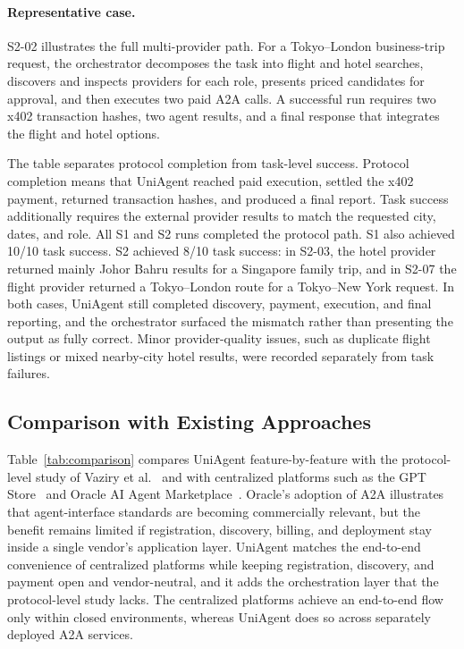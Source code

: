 \documentclass[sigconf]{acmart}
\begin{document}
\paragraph{Representative case.}
S2-02 illustrates the full multi-provider path. For a Tokyo--London
business-trip request, the orchestrator decomposes the task into flight
and hotel searches, discovers and inspects providers for each role,
presents priced candidates for approval, and then executes two paid A2A
calls. A successful run requires two x402 transaction hashes, two agent
results, and a final response that integrates the flight and hotel
options.

The table separates protocol completion from task-level
success. Protocol completion means that UniAgent reached paid execution,
settled the x402 payment, returned transaction hashes, and produced a
final report. Task success additionally requires the external provider
results to match the requested city, dates, and role. All S1 and S2 runs
completed the protocol path. S1 also achieved 10/10 task success. S2
achieved 8/10 task success: in S2-03, the hotel provider returned mainly
Johor Bahru results for a Singapore family trip, and in S2-07 the flight
provider returned a Tokyo--London route for a Tokyo--New York request.
In both cases, UniAgent still completed discovery, payment, execution,
and final reporting, and the orchestrator surfaced the mismatch rather
than presenting the output as fully correct. Minor provider-quality
issues, such as duplicate flight listings or mixed nearby-city hotel
results, were recorded separately from task failures.

\subsection{Comparison with Existing Approaches}
Table~\ref{tab:comparison} compares UniAgent feature-by-feature with the
protocol-level study of Vaziry et al.~\cite{vaziry2025} and with
centralized platforms such as the GPT Store~\cite{gptstore} and Oracle
AI Agent Marketplace~\cite{oracleAgentMarketplace2025}. Oracle's
adoption of A2A illustrates that agent-interface standards are becoming
commercially relevant, but the benefit remains limited if registration,
discovery, billing, and deployment stay inside a single vendor's
application layer. UniAgent matches the end-to-end
convenience of centralized platforms while keeping registration,
discovery, and payment open and vendor-neutral, and it adds the
orchestration layer that the protocol-level study lacks. The centralized
platforms achieve an end-to-end flow only within closed environments,
whereas UniAgent does so across separately deployed A2A services.
\end{document}
